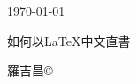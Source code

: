 
\begin{alwayssingle}
\today
\null\vfill
\begin{center}
{\fontsize{40pt}{20pt}\selectfont 如何以\LaTeX{}中文直書}
\end{center}
\null\vfill
\begin{flushright}
{\fontsize{30pt}{20pt}\selectfont 羅吉昌\copyright}
\end{flushright}
\NoBgThispage
\end{alwayssingle}
